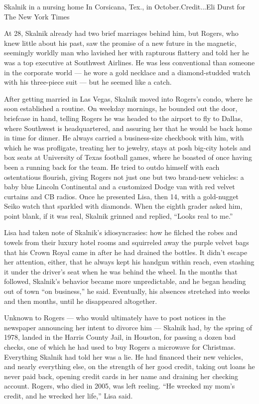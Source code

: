 Skalnik in a nursing home In Corsicana, Tex., in October.Credit...Eli
Durst for The New York Times

At 28, Skalnik already had two brief marriages behind him, but Rogers,
who knew little about his past, saw the promise of a new future in the
magnetic, seemingly worldly man who lavished her with rapturous flattery
and told her he was a top executive at Southwest Airlines. He was less
conventional than someone in the corporate world --- he wore a gold
necklace and a diamond-studded watch with his three-piece suit --- but
he seemed like a catch.

After getting married in Las Vegas, Skalnik moved into Rogers's condo,
where he soon established a routine. On weekday mornings, he bounded out
the door, briefcase in hand, telling Rogers he was headed to the airport
to fly to Dallas, where Southwest is headquartered, and assuring her
that he would be back home in time for dinner. He always carried a
business-size checkbook with him, with which he was profligate, treating
her to jewelry, stays at posh big-city hotels and box seats at
University of Texas football games, where he boasted of once having been
a running back for the team. He tried to outdo himself with each
ostentatious flourish, giving Rogers not just one but two brand-new
vehicles: a baby blue Lincoln Continental and a customized Dodge van
with red velvet curtains and CB radios. Once he presented Lisa, then 14,
with a gold-nugget Seiko watch that sparkled with diamonds. When the
eighth grader asked him, point blank, if it was real, Skalnik grinned
and replied, ``Looks real to me.''

Lisa had taken note of Skalnik's idiosyncrasies: how he filched the
robes and towels from their luxury hotel rooms and squirreled away the
purple velvet bags that his Crown Royal came in after he had drained the
bottles. It didn't escape her attention, either, that he always kept his
handgun within reach, even stashing it under the driver's seat when he
was behind the wheel. In the months that followed, Skalnik's behavior
became more unpredictable, and he began heading out of town ``on
business,'' he said. Eventually, his absences stretched into weeks and
then months, until he disappeared altogether.

Unknown to Rogers --- who would ultimately have to post notices in the
newspaper announcing her intent to divorce him --- Skalnik had, by the
spring of 1978, landed in the Harris County Jail, in Houston, for
passing a dozen bad checks, one of which he had used to buy Rogers a
microwave for Christmas. Everything Skalnik had told her was a lie. He
had financed their new vehicles, and nearly everything else, on the
strength of her good credit, taking out loans he never paid back,
opening credit cards in her name and draining her checking account.
Rogers, who died in 2005, was left reeling. ``He wrecked my mom's
credit, and he wrecked her life,'' Lisa said.

